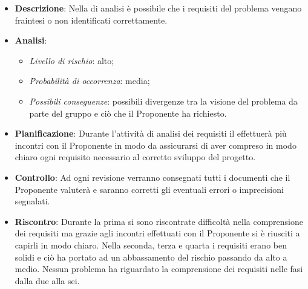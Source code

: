 			\begin{itemize}
				\item \textbf{Descrizione}: Nella  di analisi è possibile che i requisiti del problema vengano fraintesi o non identificati correttamente. 
				\item \textbf{Analisi}:
				\begin{itemize}
					\item \textit{Livello di rischio}: alto;
					\item \textit{Probabilità di occorrenza}: media;
					\item \textit{Possibili conseguenze}: possibili divergenze tra la visione del problema da parte del gruppo e ciò che il Proponente ha richiesto.
				\end{itemize}
				\item \textbf{Pianificazione}: Durante l'attività di analisi dei requisiti il  effettuerà più incontri con il Proponente in modo da assicurarsi di aver compreso in modo chiaro ogni requisito necessario al corretto sviluppo del progetto.
				\item \textbf{Controllo}: Ad ogni revisione verranno consegnati tutti i documenti che il Proponente valuterà e saranno corretti gli eventuali errori o imprecisioni segnalati.
				\item \textbf{Riscontro}: Durante la prima  si sono riscontrate difficoltà nella comprensione dei requisiti ma grazie agli incontri effettuati con il Proponente si è riusciti a capirli in modo chiaro. Nella seconda, terza e quarta  i requisiti erano ben solidi e ciò ha portato ad un abbassamento del rischio passando da alto a medio. Nessun problema ha riguardato la comprensione dei requisiti nelle fasi dalla due alla sei.
			\end{itemize}

